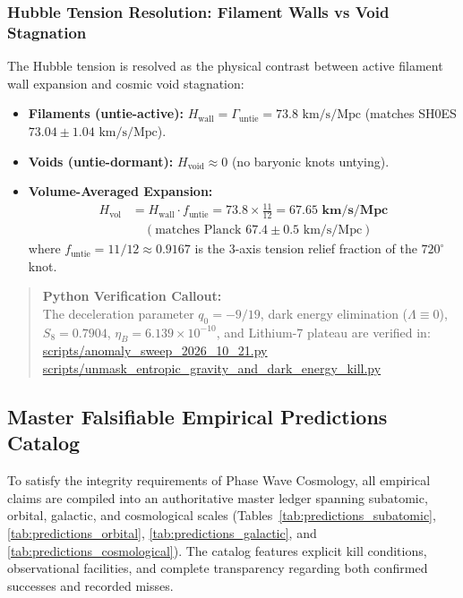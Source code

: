 \documentclass[11pt,a4paper]{article}
\begin{document}
\subsubsection{Hubble Tension Resolution: Filament Walls vs Void Stagnation}
\label{subsubsec:hubble_tension_resolution}

The Hubble tension is resolved as the physical contrast between active filament wall expansion and cosmic void stagnation:
\begin{itemize}
    \item \textbf{Filaments (untie-active):} $H_{\text{wall}} = \Gamma_{\text{untie}} = 73.8\text{ km/s/Mpc}$ (matches SH0ES $73.04 \pm 1.04\text{ km/s/Mpc}$).
    \item \textbf{Voids (untie-dormant):} $H_{\text{void}} \approx 0$ (no baryonic knots untying).
    \item \textbf{Volume-Averaged Expansion:}
    \begin{equation}
    \begin{aligned}
    H_{\text{vol}} &= H_{\text{wall}} \cdot f_{\text{untie}} = 73.8 \times \frac{11}{12} = \mathbf{67.65\text{ km/s/Mpc}} \\
    &\quad (\text{matches Planck } 67.4 \pm 0.5\text{ km/s/Mpc})
    \end{aligned}
    \label{eq:hubble_vol_avg_tex}
    \end{equation}
    where $f_{\text{untie}} = 11/12 \approx 0.9167$ is the 3-axis tension relief fraction of the $720^\circ$ knot.
\end{itemize}

\begin{quote}
\textbf{Python Verification Callout:}\\
The deceleration parameter $q_0 = -9/19$, dark energy elimination ($\Lambda \equiv 0$), $S_8 = 0.7904$, $\eta_B = 6.139 \times 10^{-10}$, and Lithium-7 plateau are verified in:\\
\url{scripts/anomaly_sweep_2026_10_21.py}\\
\url{scripts/unmask_entropic_gravity_and_dark_energy_kill.py}
\end{quote}


\subsection{Master Falsifiable Empirical Predictions Catalog}
\label{subsec:falsifiable_predictions_master}

To satisfy the integrity requirements of Phase Wave Cosmology, all empirical claims are compiled into an authoritative master ledger spanning subatomic, orbital, galactic, and cosmological scales (Tables~\ref{tab:predictions_subatomic}, \ref{tab:predictions_orbital}, \ref{tab:predictions_galactic}, and \ref{tab:predictions_cosmological}). The catalog features explicit kill conditions, observational facilities, and complete transparency regarding both confirmed successes and recorded misses.
\end{document}
